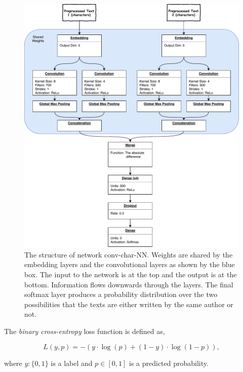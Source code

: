 \begin{figure}
    \centering
    \includegraphics[width=\textwidth]{./pictures/experiments/conv_char_nn/model}
    \caption{The structure of network \gls{conv-char-NN}. Weights are
        shared by the embedding layers and the convolutional layers as shown by
        the blue box. The input to the network is at the top and the output is
        at the bottom. Information flows downwards through the layers. The final
        softmax layer produces a probability distribution over the two
        possibilities that the texts are either written by the same author or
        not.}
    \label{fig:conv-char-NN}
\end{figure}

\begin{lemma}

    The \textit{binary cross-entropy} loss function is defined as,

    \begin{equation}\label{eq:binary_ce}
        L(y, p) = -(y \cdot \log(p) + (1- y)\cdot\log(1 - p)),
    \end{equation}

    where $y : \{0,1\}$ is a label and $p \in [0,1]$ is a predicted probability.

\end{lemma}

